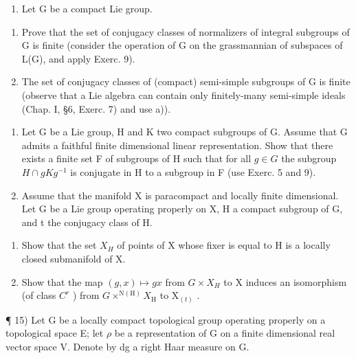 \begin{enumerate}
\def\labelenumi{\arabic{enumi})}
\setcounter{enumi}{11}
\tightlist
\item
  Let \(\mathrm{G}\) be a compact Lie group.
\end{enumerate}

\begin{enumerate}
\def\labelenumi{\alph{enumi})}
\item
  Prove that the set of conjugacy classes of normalizers of integral subgroups of G is finite (consider the operation of G on the grassmannian of subspaces of L(G), and apply Exerc. 9).
\item
  The set of conjugacy classes of (compact) semi-simple subgroups of G is finite (observe that a Lie algebra can contain only finitely-many semi-simple ideals (Chap. I, §6, Exerc. 7) and use a)).
\end{enumerate}

\begin{enumerate}
\def\labelenumi{\arabic{enumi})}
\setcounter{enumi}{12}
\item
  Let G be a Lie group, H and K two compact subgroups of G. Assume that G admits a faithful finite dimensional linear representation. Show that there exists a finite set F of subgroups of H such that for all \(g \in G\) the subgroup \(H \cap gKg^{-1}\) is conjugate in H to a subgroup in F (use Exerc. 5 and 9).
\item
  Assume that the manifold X is paracompact and locally finite dimensional. Let G be a Lie group operating properly on X, H a compact subgroup of G, and t the conjugacy class of H.
\end{enumerate}

\begin{enumerate}
\def\labelenumi{\alph{enumi})}
\item
  Show that the set \(X_{H}\) of points of X whose fixer is equal to H is a locally closed submanifold of X.
\item
  Show that the map \((g,x)\mapsto gx\) from \(G\times X_{H}\) to X induces an isomorphism (of class \(C^{r}\) ) from \(G\times^{\mathrm{N(H)}}X_{\mathrm{H}}\) to \(\mathrm{X}_{(t)}\) .
\end{enumerate}

¶ 15) Let G be a locally compact topological group operating properly on a topological space E; let \(\rho\) be a representation of G on a finite dimensional real vector space V. Denote by dg a right Haar measure on G.

